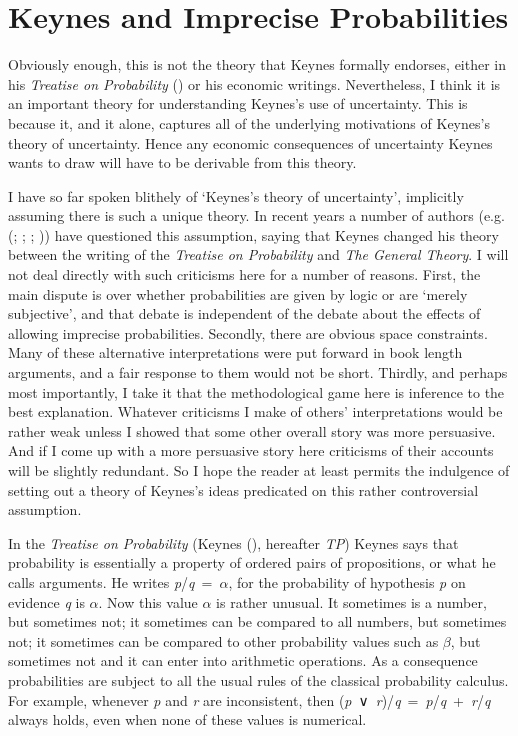 \documentclass[
  10pt,
  letterpaper,
  DIV=11,
  numbers=noendperiod,
  twoside]{scrartcl}
\begin{document}
\section{Keynes and Imprecise
Probabilities}\label{keynes-and-imprecise-probabilities}

Obviously enough, this is not the theory that Keynes formally endorses,
either in his \emph{Treatise on Probability}
() or his economic writings.
Nevertheless, I think it is an important theory for understanding
Keynes's use of uncertainty. This is because it, and it alone, captures
all of the underlying motivations of Keynes's theory of uncertainty.
Hence any economic consequences of uncertainty Keynes wants to draw will
have to be derivable from this theory.

I have so far spoken blithely of `Keynes's theory of uncertainty',
implicitly assuming there is such a unique theory. In recent years a
number of authors (e.g. (;
; ; )) have questioned this
assumption, saying that Keynes changed his theory between the writing of
the \emph{Treatise on Probability} and \emph{The General Theory}. I will
not deal directly with such criticisms here for a number of reasons.
First, the main dispute is over whether probabilities are given by logic
or are `merely subjective', and that debate is independent of the debate
about the effects of allowing imprecise probabilities. Secondly, there
are obvious space constraints. Many of these alternative interpretations
were put forward in book length arguments, and a fair response to them
would not be short. Thirdly, and perhaps most importantly, I take it
that the methodological game here is inference to the best explanation.
Whatever criticisms I make of others' interpretations would be rather
weak unless I showed that some other overall story was more persuasive.
And if I come up with a more persuasive story here criticisms of their
accounts will be slightly redundant. So I hope the reader at least
permits the indulgence of setting out a theory of Keynes's ideas
predicated on this rather controversial assumption.

In the \emph{Treatise on Probability} (Keynes
(), hereafter \emph{TP}) Keynes says that
probability is essentially a property of ordered pairs of propositions,
or what he calls arguments. He writes \emph{p}/\emph{q}~=~\(\alpha\),
for the probability of hypothesis \emph{p} on evidence \emph{q} is
\(\alpha\). Now this value \(\alpha\) is rather unusual. It sometimes is
a number, but sometimes not; it sometimes can be compared to all
numbers, but sometimes not; it sometimes can be compared to other
probability values such as \(\beta\), but sometimes not and it can enter
into arithmetic operations. As a consequence probabilities are subject
to all the usual rules of the classical probability calculus. For
example, whenever \emph{p} and \emph{r} are inconsistent, then
(\emph{p}~∨~\emph{r})/\emph{q}~=~\emph{p}/\emph{q}~+~\emph{r}/\emph{q}
always holds, even when none of these values is numerical.
\end{document}
